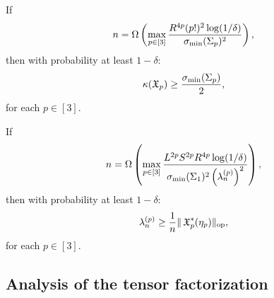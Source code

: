 

\begin{lemma}
\label{lem:lowRankLower}
If $$n = \Omega \left(\max_{p\in [3]} \frac{R^{4p} (p!)^2 \log(1/\delta)}{\sigma_\text{\rm min}(\Sigma_p)^2} \right),$$
then with probability at least $1-\delta$:
$$\kappa(\operatorname{\mathfrak{X}}_p) \ge \frac{\sigma_\text{\rm min}(\Sigma_p)}{2},$$
for each $p \in [3]$.
\end{lemma}


\begin{lemma}
\label{lem:lowRankUpper}
If $$n = \Omega \left(\max_{p\in [3]} \frac{L^{2p} S^{2p} R^{4p} \log(1/\delta)}{ \sigma_\text{\rm min}(\Sigma_1)^2 \left(\lambda_n^{(p)}\right)^2} \right),$$
then with probability at least $1-\delta$:
$$\lambda_n^{(p)} \ge \frac1{n} \|\operatorname{\mathfrak{X}}_p^*(\eta_p)\|_{\text{\rm op}},$$
for each $p \in [3]$.
\end{lemma}

\subsection{Analysis of the tensor factorization} 
\label{sec:tensorError}

